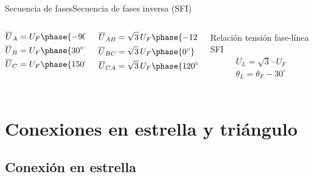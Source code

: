 \documentclass[aspectratio=169, xcolor={usenames,svgnames,dvipsnames}]{beamer}
\begin{document}
\begin{frame}{Secuencia de fases}{Secuencia de fases inversa (SFI)}
\begin{columns}
\begin{column}{0.2\columnwidth}
\begin{align*}
  \overline{U}_A &= U_F\phase{{\ang{-90}}}\\
  \overline{U}_B &= U_F\phase{\ang{30}}\\
  \overline{U}_C &= U_F\phase{\ang{150}}
\end{align*}
\end{column}
\begin{column}{0.2\columnwidth}
\begin{align*}
  \overline{U}_{AB} &= \sqrt{3}\,U_F\phase{\ang{-120}}\\
  \overline{U}_{BC} &= \sqrt{3}\,U_F\phase{\ang{0}}\\
  \overline{U}_{CA} &= \sqrt{3}\,U_F\phase{\ang{120}}
\end{align*}
\end{column}
\begin{column}{0.4\columnwidth}
\begin{block}{Relación tensión fase-línea SFI}
	\begin{equation*}
		\boxed{
			\begin{array}{l}
				U_L = \sqrt{3}\cdot U_F\\
				\theta_L = \theta_F - 30^\circ\\
			\end{array}
		} 
	\end{equation*}
\end{block}
\end{column}
\end{columns}
\end{frame}

\section{Conexiones en estrella y triángulo}

\subsection{Conexión en estrella}
\end{document}
